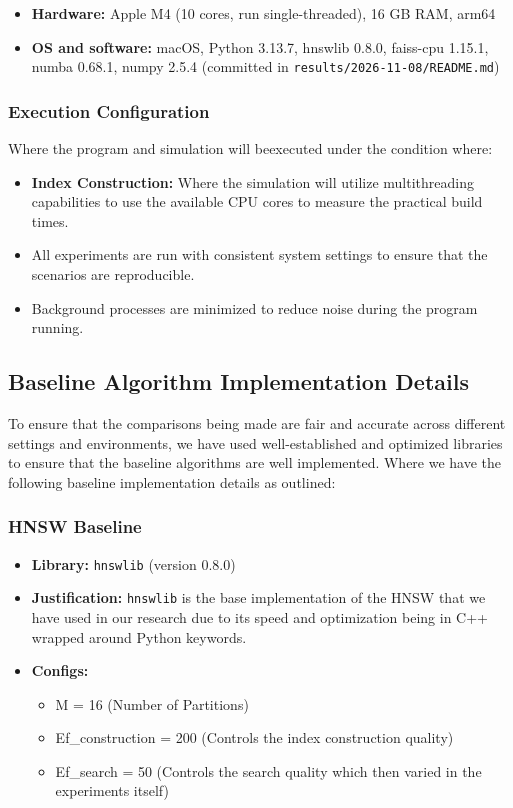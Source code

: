 \documentclass[conference]{IEEEtran}
\begin{document}
\begin{itemize}
\item \textbf{Hardware:} Apple M4 (10 cores, run single-threaded), 16 GB RAM, arm64
\item \textbf{OS and software:} macOS, Python 3.13.7, hnswlib 0.8.0, faiss-cpu 1.15.1, numba 0.68.1, numpy 2.5.4 (committed in \texttt{results/2026-11-08/README.md})
\end{itemize}

\subsubsection{Execution Configuration}
Where the program and simulation will beexecuted under the condition where:
\begin{itemize}
    \item \textbf{Index Construction:} Where the simulation will utilize multithreading capabilities to use the available CPU cores to measure the practical build times.
    \item All experiments are run with consistent system settings to ensure that the scenarios are reproducible.
    \item Background processes are minimized to reduce noise during the program running.
\end{itemize}

\subsection{Baseline Algorithm Implementation Details}
To ensure that the comparisons being made are fair and accurate across different settings and environments, we have used well-established and optimized libraries to ensure that the baseline algorithms are well implemented. Where we have the following baseline implementation details as outlined:

\subsubsection{HNSW Baseline}
\begin{itemize}
    \item \textbf{Library:} \texttt{hnswlib} (version 0.8.0)
    \item \textbf{Justification:} \texttt{hnswlib} is the base implementation of the HNSW that we have used in our research due to its speed and optimization being in C++ wrapped around Python keywords.
    \item \textbf{Configs:}
    \begin{itemize}
        \item[i.] M = 16 (Number of Partitions)
        \item[ii.] Ef\_construction = 200 (Controls the index construction quality)
        \item[iii.] Ef\_search = 50 (Controls the search quality which then varied in the experiments itself)
    \end{itemize}
\end{itemize}
\end{document}
